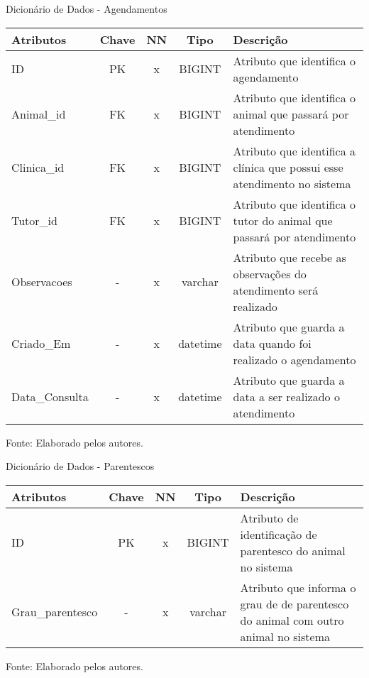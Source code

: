 \documentclass[
    12pt,               %
    openright,          %
    oneside,
    a4paper,            %
    BIBLATEX,           %
    TODO,               %
    english,            %
    brazil              %
    ]{ifsp-spo-inf-ctds}
\begin{document}
    \begin{center}
      \begin{quadro}[H]
      \centering
          \caption{Dicionário de Dados - Agendamentos}
          \begin{tabulary}{1.0\textwidth}{|p{9em}|c|c|c|p{19em}|}
        \hline
        Atributos & Chave & NN & Tipo & Descrição\\
        \hline
        ID & PK & x & BIGINT & Atributo que identifica o agendamento \\
        \hline
        Animal\_id & FK & x & BIGINT & Atributo que identifica o animal que passará por atendimento \\
        \hline
        Clinica\_id & FK & x & BIGINT & Atributo que identifica a clínica que possui esse atendimento no sistema \\
        \hline
        Tutor\_id & FK & x & BIGINT & Atributo que identifica o tutor do animal que passará por atendimento \\
        \hline
        Observacoes & - & x & varchar & Atributo que recebe as observações do atendimento será realizado \\
        \hline
        Criado\_Em & - & x & datetime & Atributo que guarda a data quando foi realizado o agendamento\\
        \hline
        Data\_Consulta & - & x & datetime & Atributo que guarda a data a ser realizado o atendimento \\
        \hline
        \end{tabulary}

          \label{qd: md-agendamento}
          \centering
        {\footnotesize Fonte: Elaborado pelos autores.}
      \end{quadro}
    \end{center} 

    \begin{center}
        \begin{quadro}[H]
        \centering
                \caption{Dicionário de Dados - Parentescos}
                  \begin{tabulary}{1.0\textwidth}{|p{9em}|c|c|c|p{19em}|}
            \hline
            Atributos & Chave & NN & Tipo & Descrição\\
            \hline
            ID & PK & x & BIGINT & Atributo de identificação de parentesco do animal no sistema \\
            \hline
            Grau\_parentesco & - & x & varchar & Atributo que informa o grau de de parentesco do animal com outro animal no sistema\\
            \hline
            \end{tabulary}

                \label{qd: md-parentesco}
                \centering
        {\footnotesize Fonte: Elaborado pelos autores.}
              \end{quadro}
            \end{center}  
\end{document}

